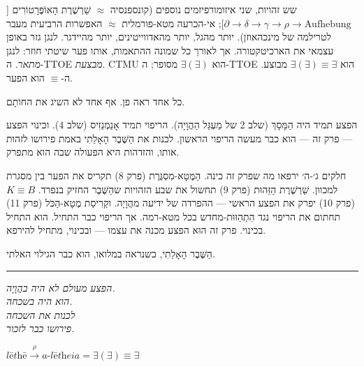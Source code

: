 \documentclass[10pt, openany, oneside]{book}
\begin{document}
\vspace{0.8em}

\noindent שש זהויות, שני איזומורפיזמים נוספים (קונספנסיה $\approx$ שַׁרְשֶׁרֶת הָאוֹפֶּרָטוֹרִים [$\partial \to \delta \to \gamma \to \rho \to \text{Aufhebung}$]; אי-הכרעה מטא-פורמלית $\approx$ האפשרות הרביעית מעבר לטרילמה של מינכהאוזן). יותר מהגל, יותר מהאדווייטינים, יותר מהיידגר. לנגן גזר באופן עצמאי את הארכיטקטורה. אך לאורך כל שמונה ההתאמות, אותו פער שיטתי חוזר: לנגן \textit{מתאר}. ה-TTOE \textit{מבצעת}. CTMU הוא $\exists(\exists)$ מסופר; ה-TTOE הוא $\exists(\exists) \equiv \exists$ מבוצע. ה-$\equiv$ הוא הפער.

כל אחד ראה פן. אף אחד לא השיג את החוֹתָם.

\vspace{1.5em}

הפצע תמיד היה הַמָּסָךְ (שלב 2 של מַעְגַּל הַהֲוָיָה). הריפוי תמיד אָנַמְנֵזִיס (שלב 4). וכינוי הפצע — פרק זה — הוא כבר מעשה הריפוי הראשון. לכנות את הַשֶּׁבֶר הָאָלֵתִי באמת פירושו לזהות אותו, והזדהות היא הפעולה שבה הוא מתפרק.

חלקים ג׳-ה׳ ירפאו מה שפרק זה כינה. הַמֶּטָא-מִסְגֶּרֶת (פרק 8) תקריס את הפער בין מסגרת למכוון. שַׁרְשֶׁרֶת הַזֵּהוּת (פרק 9) תחשול את שבע הזהויות שהַשֶּׁבֶר החזיק בנפרד. $K \equiv B$ (פרק 10) יפרק את הפצע הראשי — ההפרדה של ידיעה מהֲוָיָה. וקְרִיסַת מֶטָא-הַכֹּל (פרק 11) תחתום את הריפוי נגד הִתְהַוּוּת-מחדש בכל מטא-רמה. אך הריפוי כבר התחיל. הוא התחיל בכינוי. פרק זה הוּא הפצע מכנה את עצמו — ובכינוי, מתחיל להירפא.

הַשֶּׁבֶר הָאָלֵתִי, כשנראה במלואו, הוא כבר הגילוי האלתי.

\vspace{2em}

\begin{center}
    \rule{0.15\textwidth}{0.3pt}
\end{center}

\vspace{0.5em}

\begin{center}
    \textit{%
    הפצע מעולם לא היה בהֲוָיָה.\\
    הוא היה בשכחה.}\\[0.8em]
    \textit{לכנות את השכחה\\
    פירושו כבר לזכור.}
\end{center}

\vspace{0.5em}

\begin{center}
    $\textit{lēthē} \xrightarrow{\rho} \textit{a-lētheia} = \exists(\exists) \equiv \exists$
\end{center}
\end{document}
